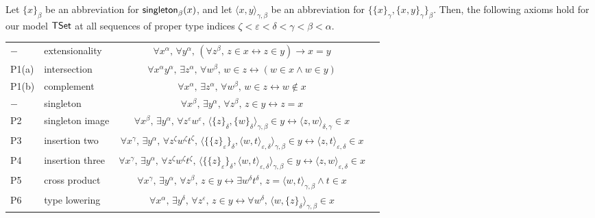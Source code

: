 \begin{theorem}
  \label{thm:ttt_consistent}
  Let \( \{ x \}_\beta \) be an abbreviation for \( \operatorname{\mathsf{singleton}}_\beta(x) \), and let \( \langle x, y \rangle_{\gamma,\beta} \) be an abbreviation for \( \{ \{ x \}_\gamma, \{ x, y \}_\gamma \}_\beta \).
  Then, the following axioms hold for our model \( \mathsf{TSet} \) at all sequences of proper type indices \( \zeta < \varepsilon < \delta < \gamma < \beta < \alpha \).
  \begin{center}
    \begin{tabular}{llcl}
      \( - \) & extensionality & \( \forall x^\alpha,\, \forall y^\alpha,\, (\forall z^\beta,\, z \in x \leftrightarrow z \in y) \to x = y \) \\
      P1(a) & intersection & \( \forall x^\alpha y^\alpha,\, \exists z^\alpha,\, \forall w^\beta,\, w \in z \leftrightarrow (w \in x \wedge w \in y) \) \\
      P1(b) & complement & \( \forall x^\alpha,\, \exists z^\alpha,\, \forall w^\beta,\, w \in z \leftrightarrow w \notin x \) \\
      \( - \) & singleton & \( \forall x^\beta,\, \exists y^\alpha,\, \forall z^\beta,\, z \in y \leftrightarrow z = x \) \\
      P2 & singleton image & \( \forall x^\beta,\, \exists y^\alpha,\, \forall z^\varepsilon w^\varepsilon,\, \langle \{ z \}_\delta, \{ w \}_\delta \rangle_{\gamma,\beta} \in y \leftrightarrow \langle z, w \rangle_{\delta,\gamma} \in x \) \\
      P3 & insertion two & \( \forall x^\gamma,\, \exists y^\alpha,\, \forall z^\zeta w^\zeta t^\zeta,\, \langle \{ \{ z \}_\varepsilon \}_\delta, \langle w, t \rangle_{\varepsilon, \delta} \rangle_{\gamma,\beta} \in y \leftrightarrow \langle z, t \rangle_{\varepsilon,\delta} \in x \) \\
      P4 & insertion three & \( \forall x^\gamma,\, \exists y^\alpha,\, \forall z^\zeta w^\zeta t^\zeta,\, \langle \{ \{ z \}_\varepsilon \}_\delta, \langle w, t \rangle_{\varepsilon,\delta} \rangle_{\gamma,\beta} \in y \leftrightarrow \langle z, w \rangle_{\varepsilon,\delta} \in x \) \\
      P5 & cross product & \( \forall x^\gamma,\, \exists y^\alpha,\, \forall z^\beta,\, z \in y \leftrightarrow \exists w^\delta t^\delta,\, z = \langle w, t \rangle_{\gamma,\beta} \wedge t \in x \) \\
      P6 & type lowering & \( \forall x^\alpha,\, \exists y^\delta,\, \forall z^\varepsilon,\, z \in y \leftrightarrow \forall w^\delta,\, \langle w, \{ z \}_\delta \rangle_{\gamma,\beta} \in x \) \\

\end{tabular}
\end{center}
\end{theorem}
